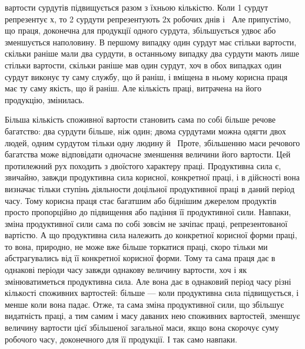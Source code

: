 \parcont{}  %
вартости сурдутів підвищується разом з їхньою кількістю. Коли
1 сурдут репрезентує $х$, то 2 сурдути репрезентують $2х$ робочих
днів і~ Але припустімо, що праця, доконечна для продукції
одного сурдута, збільшується удвоє або зменшується наполовину.
В першому випадку один сурдут має стільки вартости, скільки
раніше мали два сурдути, в останньому випадку два сурдути
мають лише стільки вартости, скільки раніше мав один сурдут,
хоч в обох випадках один сурдут виконує ту саму службу, що й
раніш, і вміщена в ньому корисна праця має ту саму якість, що
й раніш. Але кількість праці, витрачена на його продукцію,
змінилась.

Більша кількість споживної вартости становить сама по собі
більше речове багатство: два сурдути більше, ніж один; двома
сурдутами можна одягти двох людей, одним сурдутом тільки одну
людину й~ Проте, збільшенню маси речового багатства може
відповідати одночасне зменшення величини його вартости. Цей
протилежний рух походить з двоїстого характеру праці. Продуктивна
сила є, звичайно, завжди продуктивна сила корисної, конкретної
праці, і в дійсності вона визначає тільки ступінь діяльности
доцільної продуктивної праці в даний період часу. Тому
корисна праця стає багатшим або біднішим джерелом продуктів
просто пропорційно до підвищення або падіння її продуктивної
сили. Навпаки, зміна продуктивної сили сама по собі зовсім не
зачіпає праці, репрезентованої вартістю. А що продуктивна сила належить
до конкретної корисної форми праці, то вона, природно, не
може вже більше торкатися праці, скоро тільки ми абстрагувались
від її конкретної корисної форми. Тому та сама праця дає в однакові
періоди часу завжди однакову величину вартости, хоч і як
змінюватиметься продуктивна сила. Але вона дає в однаковий
період часу різні кількості споживних вартостей: більше — коли
продуктивна сила підвищується, і менше коли вона падає. Отже,
та сама зміна продуктивної сили, що збільшує видатність праці,
а тим самим і масу даваних нею споживних вартостей, зменшує
величину вартости цієї збільшеної загальної маси, якщо вона
скорочує суму робочого часу, доконечного для її продукції. І так
само навпаки.

